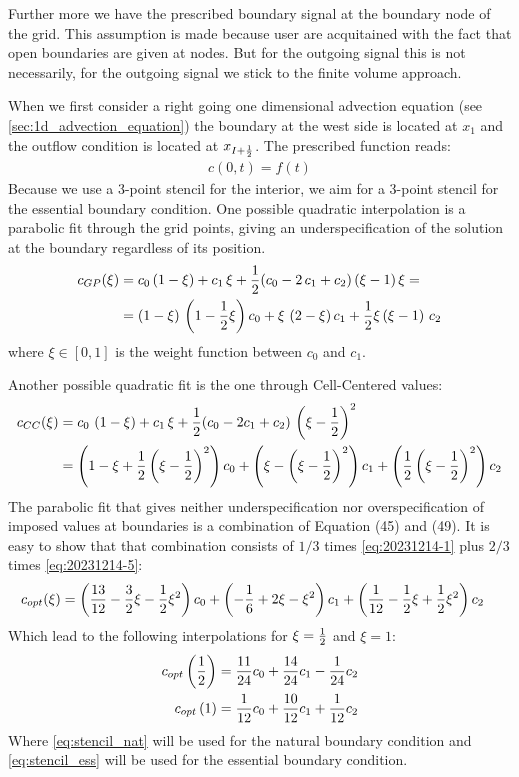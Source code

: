 Further more we have the prescribed boundary signal at the boundary node of the grid.
This assumption is made because user are acquitained with the fact that open boundaries are given at nodes.
But for the outgoing signal this is not necessarily, for the outgoing signal we stick to the finite volume approach.

When we first consider a right going one dimensional advection equation (see \autoref{sec:1d_advection_equation}) the boundary at the west side is located at $x_1$ and the outflow condition is located at $x_{I+\frac{1}{2}}$.
The prescribed function reads:
\begin{align}
    c(0,t) = f(t)
\end{align}
Because we use a 3-point stencil for the interior, we aim for a 3-point stencil for the essential boundary condition.
One possible quadratic interpolation is a parabolic fit through the grid points, giving an underspecification of the solution at the boundary regardless of its position.
\begin{align}
    c_{GP}(\xi) & = c_0 \,  (1 - \xi) + c_1 \,  \xi + \frac{1}{2}(c_0 - 2\, c_1 + c_2) \,  (\xi - 1) \,  \xi
    =
    \nonumber \\
    & =  \left(1 - \xi\right) \,  \left(1 - \frac{1}{2} \xi\right) c_0  + \xi \,  \left(2 - \xi\right) c_1 + \frac{1}{2} \xi  \left(\xi - 1\right) \,  c_2
    \label{eq:20231214-1}
\end{align}
where $\xi\in [0,1]$ is the weight function between $c_0$ and $c_1$.

Another possible quadratic fit is the one through Cell-Centered values:
\begin{align}
    c_{CC}(\xi) & = c_0 \, \left(1 - \xi\right) + c_1\,  \xi + \frac{1}{2} (c_0 - 2c_1 + c_2) \,   \left(\xi - \frac{1}{2}\right)^2
    \\
    & = \left( 1 - \xi + \frac{1}{2} \left(\xi - \frac{1}{2}\right)^2 \right) c_0 +
    \left( \xi - \left(\xi - \frac{1}{2}\right)^2  \right) c_1  +
    \left(   \frac{1}{2} \left(\xi - \frac{1}{2}\right)^2\right) c_2       \label{eq:20231214-5}
\end{align}
The parabolic fit that gives neither underspecification nor overspecification of
imposed values at boundaries is a combination of Equation (45) and (49). It is easy to show
that that combination consists of $1/3$ times \autoref{eq:20231214-1} plus $2/3$ times \autoref{eq:20231214-5}:
\begin{align}
    c_{opt}(\xi) & = \left( \frac{13}{12} - \frac{3}{2}\xi - \frac{1}{2} \xi^2 \right) c_0 +
    \left( -\frac{1}{6} + 2 \xi - \xi^2 \right) c_1  +
    \left( \frac{1}{12} - \frac{1}{2} \xi +  \frac{1}{2} \xi^2  \right) c_2       \label{eq:20231214-5}
\end{align}
Which lead to the following interpolations for $\xi=\frac{1}{2}$ and $\xi=1$:
\begin{align}
    c_{opt}\left(\frac{1}{2}\right) & = \frac{11}{24} c_0 + \frac{14}{24} c_1 - \frac{1}{24} c_2 \label{eq:stencil_nat}
    \\
    c_{opt}\left(1\right)  & = \frac{1}{12} c_0 + \frac{10}{12} c_1 + \frac{1}{12}c_2 \label{eq:stencil_ess}
\end{align}
Where \autoref{eq:stencil_nat} will be used for the natural boundary condition and \autoref{eq:stencil_ess} will be used for the essential boundary condition.

